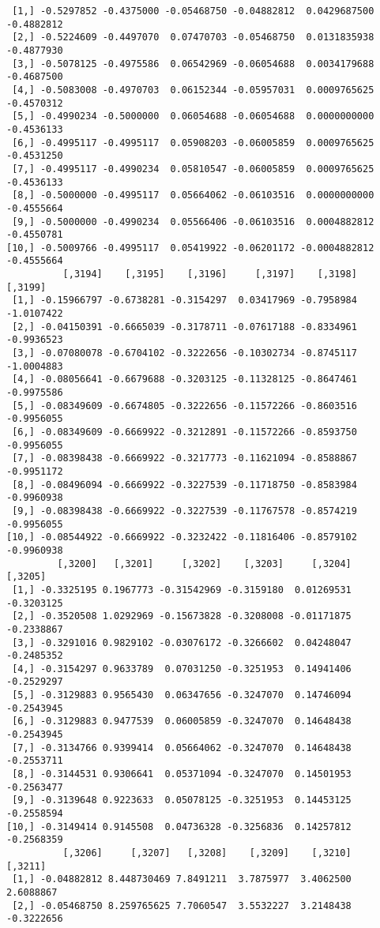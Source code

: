 \documentclass[
  letterpaper,
  DIV=11,
  numbers=noendperiod]{scrreprt}
\begin{document}
\begin{verbatim}
 [1,] -0.5297852 -0.4375000 -0.05468750 -0.04882812  0.0429687500 -0.4882812
 [2,] -0.5224609 -0.4497070  0.07470703 -0.05468750  0.0131835938 -0.4877930
 [3,] -0.5078125 -0.4975586  0.06542969 -0.06054688  0.0034179688 -0.4687500
 [4,] -0.5083008 -0.4970703  0.06152344 -0.05957031  0.0009765625 -0.4570312
 [5,] -0.4990234 -0.5000000  0.06054688 -0.06054688  0.0000000000 -0.4536133
 [6,] -0.4995117 -0.4995117  0.05908203 -0.06005859  0.0009765625 -0.4531250
 [7,] -0.4995117 -0.4990234  0.05810547 -0.06005859  0.0009765625 -0.4536133
 [8,] -0.5000000 -0.4995117  0.05664062 -0.06103516  0.0000000000 -0.4555664
 [9,] -0.5000000 -0.4990234  0.05566406 -0.06103516  0.0004882812 -0.4550781
[10,] -0.5009766 -0.4995117  0.05419922 -0.06201172 -0.0004882812 -0.4555664
          [,3194]    [,3195]    [,3196]     [,3197]    [,3198]    [,3199]
 [1,] -0.15966797 -0.6738281 -0.3154297  0.03417969 -0.7958984 -1.0107422
 [2,] -0.04150391 -0.6665039 -0.3178711 -0.07617188 -0.8334961 -0.9936523
 [3,] -0.07080078 -0.6704102 -0.3222656 -0.10302734 -0.8745117 -1.0004883
 [4,] -0.08056641 -0.6679688 -0.3203125 -0.11328125 -0.8647461 -0.9975586
 [5,] -0.08349609 -0.6674805 -0.3222656 -0.11572266 -0.8603516 -0.9956055
 [6,] -0.08349609 -0.6669922 -0.3212891 -0.11572266 -0.8593750 -0.9956055
 [7,] -0.08398438 -0.6669922 -0.3217773 -0.11621094 -0.8588867 -0.9951172
 [8,] -0.08496094 -0.6669922 -0.3227539 -0.11718750 -0.8583984 -0.9960938
 [9,] -0.08398438 -0.6669922 -0.3227539 -0.11767578 -0.8574219 -0.9956055
[10,] -0.08544922 -0.6669922 -0.3232422 -0.11816406 -0.8579102 -0.9960938
         [,3200]   [,3201]     [,3202]    [,3203]     [,3204]    [,3205]
 [1,] -0.3325195 0.1967773 -0.31542969 -0.3159180  0.01269531 -0.3203125
 [2,] -0.3520508 1.0292969 -0.15673828 -0.3208008 -0.01171875 -0.2338867
 [3,] -0.3291016 0.9829102 -0.03076172 -0.3266602  0.04248047 -0.2485352
 [4,] -0.3154297 0.9633789  0.07031250 -0.3251953  0.14941406 -0.2529297
 [5,] -0.3129883 0.9565430  0.06347656 -0.3247070  0.14746094 -0.2543945
 [6,] -0.3129883 0.9477539  0.06005859 -0.3247070  0.14648438 -0.2543945
 [7,] -0.3134766 0.9399414  0.05664062 -0.3247070  0.14648438 -0.2553711
 [8,] -0.3144531 0.9306641  0.05371094 -0.3247070  0.14501953 -0.2563477
 [9,] -0.3139648 0.9223633  0.05078125 -0.3251953  0.14453125 -0.2558594
[10,] -0.3149414 0.9145508  0.04736328 -0.3256836  0.14257812 -0.2568359
          [,3206]     [,3207]   [,3208]    [,3209]    [,3210]    [,3211]
 [1,] -0.04882812 8.448730469 7.8491211  3.7875977  3.4062500  2.6088867
 [2,] -0.05468750 8.259765625 7.7060547  3.5532227  3.2148438 -0.3222656

\end{verbatim}
\end{document}
